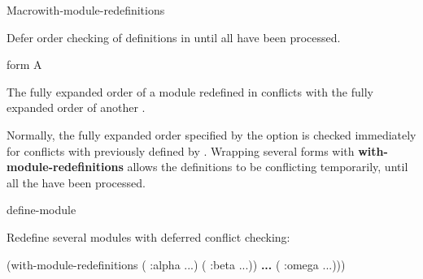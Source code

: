 \documentclass[10pt,twoside,english,pdftex]{article}
\begin{document}

\begin{functiondoc}{Macro}{with-module-redefinitions}%
  {\superstar} 
%
%
%

\fnsyntax 

\fnpurpose Defer  order checking of 
definitions in  until all  have been processed.

\fnpackage {}

\fnmodule {}

\fnargs
\begin{args}{form}
\arg[form] A 
\end{args}

\fnerrors The fully expanded  order of a module
redefined in  conflicts with the fully expanded
 order of another .

\fndescription Normally, the fully expanded  order
specified by the  option is checked immediately for conflicts
with previously defined  by \textbf{}.
Wrapping several \textbf{} forms with
\textbf{with-module-redefinitions} allows the definitions to be conflicting
temporarily, until all the  have been processed.

\begin{alsos}{define-module}
\end{alsos}

\fnexample
{}%
Redefine several modules with deferred conflict checking:
%
\W\supp
\begin{example}
  (with-module-redefinitions
    ( :alpha \textrm{...})
    ( :beta \textrm{...}))
            \textbf{...}
    ( :omega \textrm{...})))
\end{example}

\end{functiondoc}


\T\markright{}%
\T\pagestyle{plain}
\T\cleardoublepage
\W{}
\T\pagestyle{fancy}
\T\thispagestyle{fancybottom}
\T\global\def\fnlastname{ }%
\T\renewcommand{\headrulewidth}{0pt}
\end{document}
